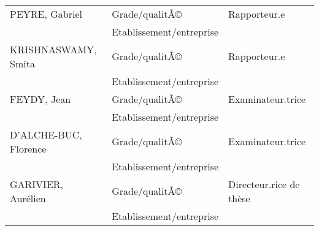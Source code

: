 \begin{titlepage}
	
	 \\
	
	\noindent \begin{tabular}{p{}p{}p{}}
		\textsc {PEYRE}, Gabriel & Grade/qualitÃ© & Rapporteur.e\\
		& Etablissement/entreprise & \\
		\textsc {KRISHNASWAMY}, Smita & Grade/qualitÃ© & Rapporteur.e\\
		& Etablissement/entreprise & \\
		\textsc {FEYDY}, Jean & Grade/qualitÃ© & Examinateur.trice\\
		& Etablissement/entreprise & \\ 
		\textsc {D'ALCHE-BUC}, Florence & Grade/qualitÃ© & Examinateur.trice\\
		& Etablissement/entreprise & \\ 
		\textsc {GARIVIER}, Aurélien & Grade/qualitÃ© & Directeur.rice de thèse\\
		& Etablissement/entreprise &  
	\end{tabular}
	
\end{titlepage}

\restoregeometry 
